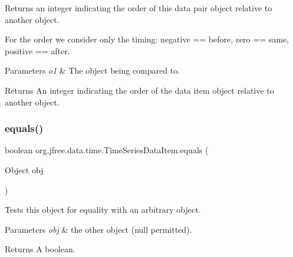Returns an integer indicating the order of this data pair object relative to another object. 

For the order we consider only the timing\+: negative == before, zero == same, positive == after.


\begin{DoxyParams}{Parameters}
{\em o1} & The object being compared to.\\
\hline
\end{DoxyParams}
\begin{DoxyReturn}{Returns}
An integer indicating the order of the data item object relative to another object. 
\end{DoxyReturn}
\mbox{\label{classorg_1_1jfree_1_1data_1_1time_1_1_time_series_data_item_a06742809c049524aa74574bd7d9ace62}} 
\subsubsection{\texorpdfstring{equals()}{equals()}}
{\footnotesize\ttfamily boolean org.\+jfree.\+data.\+time.\+Time\+Series\+Data\+Item.\+equals (\begin{DoxyParamCaption}\item[{Object}]{obj }\end{DoxyParamCaption})}

Tests this object for equality with an arbitrary object.


\begin{DoxyParams}{Parameters}
{\em obj} & the other object ({\ttfamily null} permitted).\\
\hline
\end{DoxyParams}
\begin{DoxyReturn}{Returns}
A boolean. 
\end{DoxyReturn}
\mbox{\label{classorg_1_1jfree_1_1data_1_1time_1_1_time_series_data_item_a9e21c70b1359379868bc6dabd2ab6984}} 
